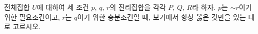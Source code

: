 전체집합 $U$에 대하여 세 조건 $p$, $q$, $r$의 진리집합을 각각 $P$, $Q$, $R$라 하자. $p$는 $\sim r$이기 위한 필요조건이고, $r$는 $q$이기 위한 충분조건일 때, 보기에서 항상 옳은 것만을 있는 대로 고르시오. 
